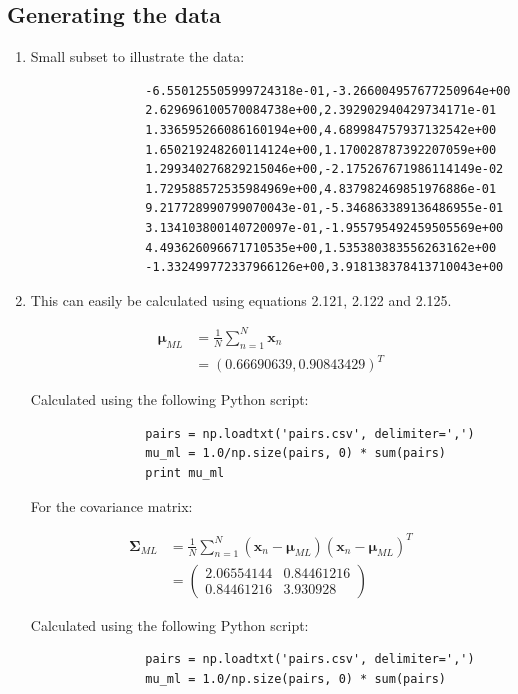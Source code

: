 \documentclass[paper=a4, fontsize=10pt]{scrartcl} %
\numberwithin{equation}{section} %
\numberwithin{figure}{section} %
\numberwithin{table}{section} %
\begin{document}
\subsection{Generating the data}
\begin{enumerate}
	\item Small subset to illustrate the data:
			\begin{verbatim}
				-6.550125505999724318e-01,-3.266004957677250964e+00
				2.629696100570084738e+00,2.392902940429734171e-01
				1.336595266086160194e+00,4.689984757937132542e+00
				1.650219248260114124e+00,1.170028787392207059e+00
				1.299340276829215046e+00,-2.175267671986114149e-02
				1.729588572535984969e+00,4.837982469851976886e-01
				9.217728990799070043e-01,-5.346863389136486955e-01
				3.134103800140720097e-01,-1.955795492459505569e+00
				4.493626096671710535e+00,1.535380383556263162e+00
				-1.332499772337966126e+00,3.918138378413710043e+00
			\end{verbatim}
	\item This can easily be calculated using equations 2.121, 2.122 and 2.125.

			\begin{align}
				\boldsymbol\mu_{ML} &= \frac{1}{N} \sum_{n=1}^N \boldsymbol x_n \\
				&= (0.66690639, 0.90843429)^T
			\end{align}

			Calculated using the following Python script:
			\begin{verbatim}
				pairs = np.loadtxt('pairs.csv', delimiter=',')
				mu_ml = 1.0/np.size(pairs, 0) * sum(pairs)
				print mu_ml
			\end{verbatim}

			For the covariance matrix:

			\begin{align}
				\boldsymbol\Sigma_{ML} &= \frac{1}{N} \sum_{n=1}^N (\boldsymbol x_n - \boldsymbol \mu_{ML})(\boldsymbol x_n - \boldsymbol\mu_{ML})^T\\
				&= \begin{pmatrix} 2.06554144 & 0.84461216 \\ 0.84461216 & 3.930928 \end{pmatrix}
			\end{align}

			Calculated using the following Python script:
			\begin{verbatim}
				pairs = np.loadtxt('pairs.csv', delimiter=',')
				mu_ml = 1.0/np.size(pairs, 0) * sum(pairs)
				

\end{verbatim}
\end{enumerate}
\end{document}
